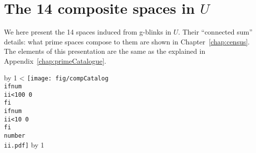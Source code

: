 \chapter{The 14 composite spaces in $U$}
\label{chap:compositeCatalogue}

We here present the 14 spaces induced from g-blinks in $U$.
Their ``connected sum'' details: what prime spaces compose to
them are shown in Chapter~\ref{chap:census}. The elements of
this presentation are the same as the explained in
Appendix~\ref{chap:primeCatalogue}.

\newcount\ii \newcount\jj   %
\def\producePagesTwo#1#2{
\ii=#1                      %
\jj=#2                      %
\advance\jj by 1            %
\loop   %
   \ifnum\ii<\jj
{
   \hspace{-1.8cm}
   \enlargethispage{5cm}
   {\centering
   \texttt{[image: fig/compCatalog\\ifnum\\ii<100 0\\fi\\ifnum\\ii<10 0\\fi\\number\\ii.pdf]}
   }
   \newpage}
      \advance\ii by 1
   \repeat
}

\newpage
\setlength{\topmargin}{-1.2cm}

\producePagesTwo{1}{3} 